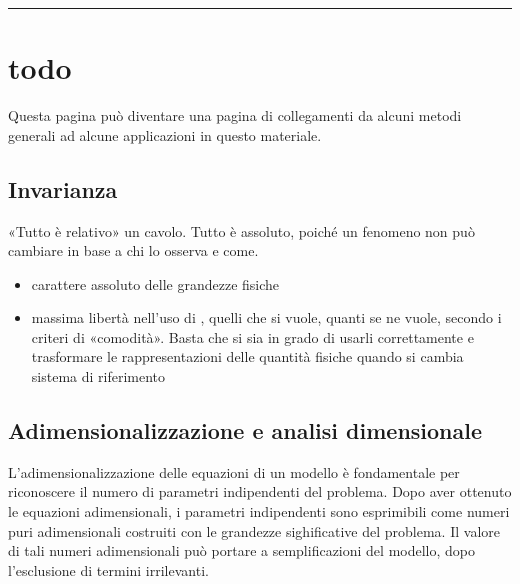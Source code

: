 \documentclass[letterpaper,10pt,italian]{jupyterBook}
\begin{document}
\bigskip\hrule\bigskip


\sphinxstepscope


\section{todo}
\label{\detokenize{ch/todo:todo}}\label{\detokenize{ch/todo:physics-hs-todo}}\label{\detokenize{ch/todo::doc}}
\sphinxAtStartPar
Questa pagina può diventare una pagina di collegamenti da alcuni metodi generali ad alcune applicazioni in questo materiale.


\subsection{Invarianza}
\label{\detokenize{ch/todo:invarianza}}\label{\detokenize{ch/todo:physics-hs-todo-invariance}}
\sphinxAtStartPar
«Tutto è relativo» un cavolo. Tutto è assoluto, poiché un fenomeno non può cambiare in base a chi lo osserva e come.
\begin{itemize}
\item {} 
\sphinxAtStartPar
carattere assoluto delle grandezze fisiche

\item {} 
\sphinxAtStartPar
massima libertà nell’uso di , quelli che si vuole, quanti se ne vuole, secondo i criteri di «comodità». Basta che si sia in grado di usarli correttamente e trasformare le rappresentazioni delle quantità fisiche quando si cambia sistema di riferimento
 

\end{itemize}


\subsection{Adimensionalizzazione e analisi dimensionale}
\label{\detokenize{ch/todo:adimensionalizzazione-e-analisi-dimensionale}}\label{\detokenize{ch/todo:physics-hs-todo-non-dimensional}}
\sphinxAtStartPar
L’adimensionalizzazione delle equazioni di un modello è fondamentale per riconoscere il numero di parametri indipendenti del problema. Dopo aver ottenuto le equazioni adimensionali, i parametri indipendenti sono esprimibili come numeri puri adimensionali costruiti con le grandezze sighificative del problema. Il valore di tali numeri adimensionali può portare a semplificazioni del modello, dopo l’esclusione di termini irrilevanti.
\end{document}
